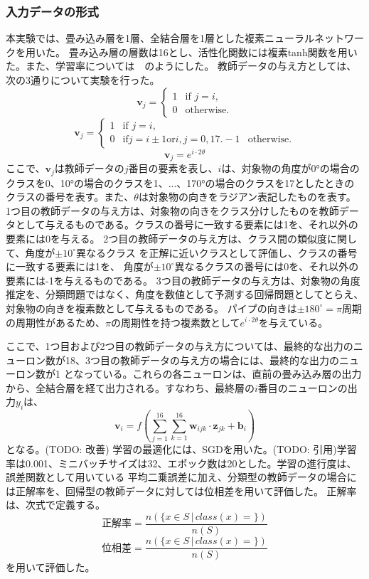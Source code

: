 \documentclass[11pt,a4paper,uplatex,draft]{ujarticle}
\begin{document}
  \subsubsection{入力データの形式}
  本実験では、畳み込み層を1層、全結合層を1層とした複素ニューラルネットワークを用いた。
  畳み込み層の層数は16とし、活性化関数には複素tanh関数を用いた。また、学習率については　のようにした。
  教師データの与え方としては、次の3通りについて実験を行った。
  \[
    \mathbf{v}_j =
    \begin{cases}
        1 & \text{if } j = i, \\
        0 & \text{otherwise}.
    \end{cases}
  \]
  \[
    \mathbf{v}_j =
    \begin{cases}
        1 & \text{if } j = i, \\
        0 & \text{if} j = i \pm 1 \text{or} {i, j} = {0, 17}.
        -1 & \text{otherwise}.
    \end{cases}
  \]
  \[
    \mathbf{v}_j = e^{i\cdot2\theta}
  \]
  ここで、$\mathbf{v}_j$は教師データの$j$番目の要素を表し、$i$は、対象物の角度が0°の場合のクラスを0、10°の場合のクラスを1、...、170°の場合のクラスを17としたときの
  クラスの番号を表す。また、$\theta$は対象物の向きをラジアン表記したものを表す。
  1つ目の教師データの与え方は、対象物の向きをクラス分けしたものを教師データとして与えるものである。クラスの番号に一致する要素には1を、それ以外の要素には0を与える。
  2つ目の教師データの与え方は、クラス間の類似度に関して、角度が$\pm10^{\circ}$異なるクラス
  を正解に近いクラスとして評価し、クラスの番号に一致する要素には1を、 角度が$\pm10^{\circ}$異なるクラスの番号には0を、それ以外の要素には-1を与えるものである。
  3つ目の教師データの与え方は、対象物の角度推定を、分類問題ではなく、角度を数値として予測する回帰問題としてとらえ、対象物の向きを複素数として与えるものである。
  パイプの向きは$\pm180^{\circ} = \pi$周期の周期性があるため、$\pi$の周期性を持つ複素数として$e^{i\cdot2\theta}$を与えている。

  ここで、1つ目および2つ目の教師データの与え方については、最終的な出力のニューロン数が18、3つ目の教師データの与え方の場合には、最終的な出力のニューロン数が1
  となっている。これらの各ニューロンは、直前の畳み込み層の出力から、全結合層を経て出力される。すなわち、最終層の$i$番目のニューロンの出力$y_i$は、
  \[
    \mathbf{v}_i = f(\sum_{j=1}^{16} \sum_{k=1}^{16} \mathbf{w}_{ijk} \cdot \mathbf{z}_{jk} + \mathbf{b}_i)
  \]
  となる。(TODO: 改善)
  学習の最適化には、SGDを用いた。(TODO: 引用)学習率は0.001、ミニバッチサイズは32、エポック数は20とした。学習の進行度は、誤差関数として用いている
  平均二乗誤差に加え、分類型の教師データの場合には正解率を、回帰型の教師データに対しては位相差を用いて評価した。
  正解率は、次式で定義する。
  \[
    \text{正解率} = \frac{n(\{x \in S \, |\, class(x) = \})}{n(S)}
  \] %
  \[
    \text{位相差} = \frac{n(\{x \in S \, |\, class(x) = \})}{n(S)}
  \] %
  を用いて評価した。
\end{document}
